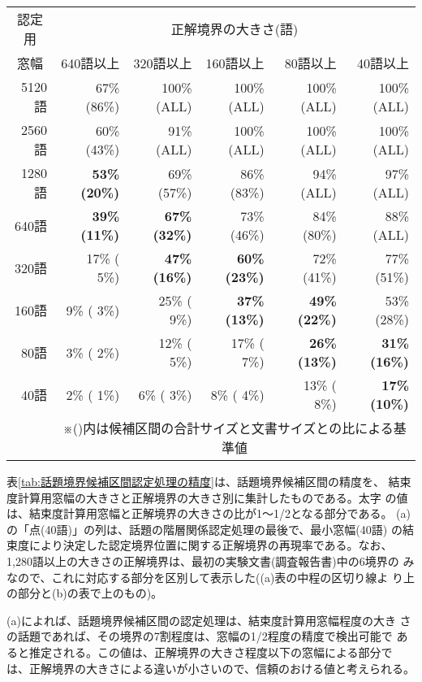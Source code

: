 \begin{table}[htbp]
\begin{center}
    \begin{tabular}{|r|r|r|r|r|r|}
      \hline
      \multicolumn{1}{|c|}{認定用}
        & \multicolumn{5}{|c|}{正解境界の大きさ(語)}\\ \cline{2-6}
      \multicolumn{1}{|c|}{窓幅}
        & 640語以上 & 320語以上 & 160語以上 & 80語以上  & 40語以上 \\
      \hline
        5120語 & 67\% (86\%) & 100\% (ALL)  & 100\% (ALL) & 100\% (ALL) & 100\% (ALL) \\
        2560語 & 60\% (43\%) &  91\% (ALL)  & 100\% (ALL) & 100\% (ALL) & 100\% (ALL) \\
        1280語 &\bf 53\% (20\%) &  69\% (57\%) & 86\% (83\%) & 94\% (ALL) & 97\% (ALL) \\
         640語 &\bf 39\% (11\%) &\bf  67\% (32\%) & 73\% (46\%) & 84\% (80\%) & 88\% (ALL) \\
         320語 & 17\% ( 5\%) &\bf  47\% (16\%) &\bf 60\% (23\%) & 72\% (41\%) & 77\% (51\%) \\
         160語 &  9\% ( 3\%) &  25\% ( 9\%) &\bf 37\% (13\%) &\bf 49\% (22\%) & 53\% (28\%) \\
          80語 &  3\% ( 2\%) &  12\% ( 5\%) & 17\% ( 7\%) &\bf 26\% (13\%) &\bf 31\% (16\%) \\
          40語 &  2\% ( 1\%) &   6\% ( 3\%) &  8\% ( 4\%) & 13\% ( 8\%) &\bf 17\% (10\%) \\
      \hline
      \multicolumn{1}{c}{}& \multicolumn{5}{c}{※()内は候補区間の合計サイズと文書サイズとの比による基準値} 
    \end{tabular}
  \end{center}
\end{table}


表\ref{tab:話題境界候補区間認定処理の精度}は、話題境界候補区間の精度を、
結束度計算用窓幅の大きさと正解境界の大きさ別に集計したものである。太字
の値は、結束度計算用窓幅と正解境界の大きさの比が1〜1/2となる部分である。
(a)の「点(40語)」の列は、話題の階層関係認定処理の最後で、最小窓幅(40語)
の結束度により決定した認定境界位置に関する正解境界の再現率である。なお、
1,280語以上の大きさの正解境界は、最初の実験文書(調査報告書)中の6境界の
みなので、これに対応する部分を区別して表示した((a)表の中程の区切り線よ
り上の部分と(b)の表で上のもの)。

(a)によれば、話題境界候補区間の認定処理は、結束度計算用窓幅程度の大き
さの話題であれば、その境界の7割程度は、窓幅の1/2程度の精度で検出可能で
あると推定される。この値は、正解境界の大きさ程度以下の窓幅による部分で
は、正解境界の大きさによる違いが小さいので、信頼のおける値と考えられる。


